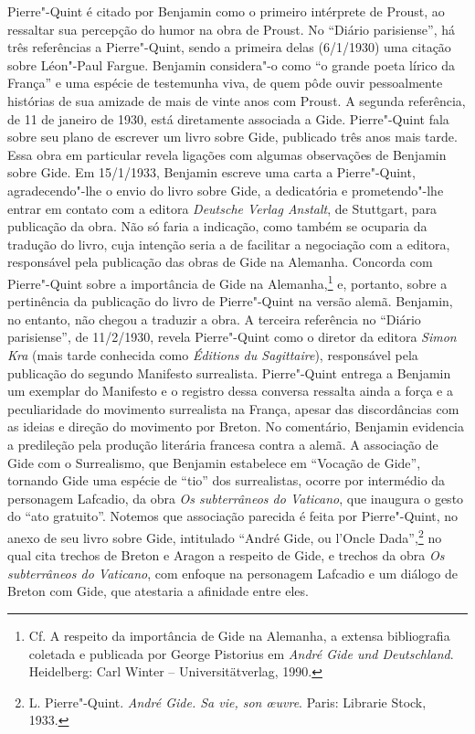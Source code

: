 Pierre"-Quint é citado por Benjamin como o primeiro intérprete de Proust,
ao ressaltar sua percepção do humor na obra de Proust. No ``Diário
parisiense'', há três referências a Pierre"-Quint, sendo a primeira delas
(6/1/1930) uma citação sobre Léon"-Paul Fargue. Benjamin considera"-o como
``o grande poeta lírico da França'' e uma espécie de testemunha viva, de
quem pôde ouvir pessoalmente histórias de sua amizade de mais de vinte
anos com Proust. A segunda referência, de 11 de janeiro de 1930, está
diretamente associada a Gide. Pierre"-Quint fala sobre seu plano de
escrever um livro sobre Gide, publicado três anos mais tarde. Essa obra
em particular revela ligações com algumas observações de Benjamin sobre
Gide. Em 15/1/1933, Benjamin escreve uma carta a Pierre"-Quint,
agradecendo"-lhe o envio do livro sobre Gide, a dedicatória e
prometendo"-lhe entrar em contato com a editora \emph{Deutsche Verlag
Anstalt}, de Stuttgart, para publicação da obra. Não só faria a
indicação, como também se ocuparia da tradução do livro, cuja intenção
seria a de facilitar a negociação com a editora, responsável pela
publicação das obras de Gide na Alemanha. Concorda com Pierre"-Quint
sobre a importância de Gide na Alemanha,\footnote{Cf. A respeito da
  importância de Gide na Alemanha, a extensa bibliografia coletada e
  publicada por George Pistorius em \emph{André Gide und Deutschland}.
  Heidelberg: Carl Winter -- Universitätverlag, 1990.} e, portanto, sobre
a pertinência da publicação do livro de Pierre"-Quint na versão alemã.
Benjamin, no entanto, não chegou a traduzir a obra. A terceira
referência no ``Diário parisiense'', de 11/2/1930, revela Pierre"-Quint
como o diretor da editora \emph{Simon Kra} (mais tarde conhecida como
\emph{Éditions du Sagittaire}), responsável pela publicação do segundo
Manifesto surrealista. Pierre"-Quint entrega a Benjamin um exemplar do
Manifesto e o registro dessa conversa ressalta ainda a força e a
peculiaridade do movimento surrealista na França, apesar das
discordâncias com as ideias e direção do movimento por Breton. No
comentário, Benjamin evidencia a predileção pela produção literária
francesa contra a alemã. A associação de Gide com o Surrealismo, que
Benjamin estabelece em ``Vocação de Gide'', tornando Gide uma espécie de
``tio'' dos surrealistas, ocorre por intermédio da personagem
Lafcadio, da obra \emph{Os subterrâneos do Vaticano}, que
inaugura o gesto do ``ato gratuito''. Notemos que associação parecida é
feita por Pierre"-Quint, no anexo de seu livro sobre Gide, intitulado
``André Gide, ou l'Oncle Dada'',\footnote{L. Pierre"-Quint. \emph{André
  Gide. Sa vie, son \oe uvre}. Paris: Librarie Stock, 1933.} no qual
cita trechos de Breton e Aragon a respeito de Gide, e trechos da obra
\emph{Os subterrâneos do Vaticano}, com enfoque na personagem
Lafcadio e um diálogo de Breton com Gide, que atestaria a afinidade
entre eles.

